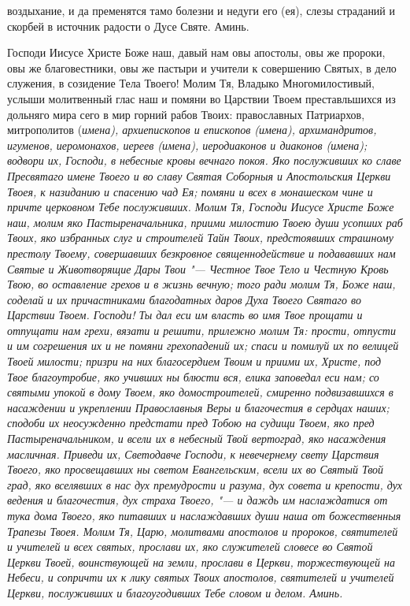 воздыхание, и да пременятся тамо болезни и недуги его (ея), слезы страданий и скорбей в источник радости о Дусе Святе. Аминь. 


\mychapterending

 


Господи Иисусе Христе Боже наш, давый нам овы апостолы, овы же пророки, овы же благовестники, овы же пастыри и учители к совершению Святых, в дело служения, в созидение Тела Твоего! Молим Тя, Владыко Многомилостивый, услыши молитвенный глас наш и помяни во Царствии Твоем преставльшихся из дольняго мира сего в мир горний рабов Твоих: православных Патриархов, митрополитов (\itshape имена\normalfont{}), архиепископов и епископов (\itshape имена\normalfont{}), архимандритов, игуменов, иеромонахов, иереев (\itshape имена\normalfont{}), иеродиаконов и диаконов (\itshape имена\normalfont{}); водвори их, Господи, в небесные кровы вечнаго покоя. Яко послуживших ко славе Пресвятаго имене Твоего и во славу Святая Соборныя и Апостольския Церкви Твоея, к назиданию и спасению чад Ея; помяни и всех в монашеском чине и причте церковном Тебе послуживших. Молим Тя, Господи Иисусе Христе Боже наш, молим яко Пастыреначальника, приими милостию Твоею души усопших раб Твоих, яко избранных слуг и строителей Тайн Твоих, предстоявших страшному престолу Твоему, совершавших безкровное священнодействие и подававших нам Святые и Животворящие Дары Твои "--- Честное Твое Тело и Честную Кровь Твою, во оставление грехов и в жизнь вечную; того ради молим Тя, Боже наш, соделай и их причастниками благодатных даров Духа Твоего Святаго во Царствии Твоем. Господи! Ты дал еси им власть во имя Твое прощати и отпущати нам грехи, вязати и решити, прилежно молим Тя: прости, отпусти и им согрешения их и не помяни грехопадений их; спаси и помилуй их по велицей Твоей милости; призри на них благосердием Твоим и приими их, Христе, под Твое благоутробие, яко учивших ны блюсти вся, елика заповедал еси нам; со святыми упокой в дому Твоем, яко домостроителей, смиренно подвизавшихся в насаждении и укреплении Православныя Веры и благочестия в сердцах наших; сподоби их неосужденно предстати пред Тобою на судищи Твоем, яко пред Пастыреначальником, и всели их в небесный Твой вертоград, яко насаждения масличная. Приведи их, Светодавче Господи, к невечернему свету Царствия Твоего, яко просвещавших ны светом Евангельским, всели их во Святый Твой град, яко вселявших в нас дух премудрости и разума, дух совета и крепости, дух ведения и благочестия, дух страха Твоего, "--- и даждь им наслаждатися от тука дома Твоего, яко питавших и наслаждавших души наша от божественныя Трапезы Твоея. Молим Тя, Царю, молитвами апостолов и пророков, святителей и учителей и всех святых, прослави их, яко служителей словесе во Святой Церкви Твоей, воинствующей на земли, прослави в Церкви, торжествующей на Небеси, и сопричти их к лику святых Твоих апостолов, святителей и учителей Церкви, послуживших и благоугодивших Тебе словом и делом. Аминь. 


